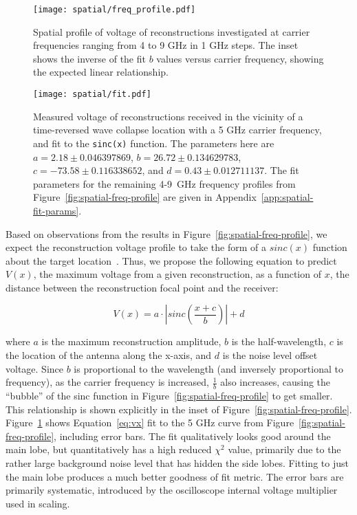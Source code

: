 \begin{figure}
\texttt{[image: spatial/freq\_profile.pdf]}
\caption[Spatial profile of reconstruction at various frequencies]{Spatial profile of \ptp{} voltage of reconstructions investigated at carrier frequencies ranging from 4 to 9 GHz in 1 GHz
steps.  The inset shows the inverse of the fit $b$ values versus carrier frequency, showing the expected linear relationship.}
\label{fig:spatial-freq-profile}

\vspace*{\floatsep}%

\texttt{[image: spatial/fit.pdf]}
\caption[Fit of spatial profile]{Measured \ptp{} voltage of reconstructions received in the
vicinity of a time-reversed wave collapse location with a 5 GHz carrier
frequency, and fit to the \texttt{sinc(x)} function. The parameters here are $a = 2.18 \pm 0.046397869$, $b = 26.72 \pm 0.134629783$, $c = -73.58 \pm 0.116338652$, and $d = 0.43 \pm 0.012711137$. The fit parameters for the remaining 4-9~GHz frequency profiles from Figure~\ref{fig:spatial-freq-profile} are given in Appendix~\ref{app:spatial-fit-params}.}
\label{fig:spatial-error-fit}
\end{figure}

Based on observations from the results in Figure~\ref{fig:spatial-freq-profile}, we expect the reconstruction \ptp{} voltage profile to take the form of a $sinc(x)$ function about the target location~\cite{lerosey-focusing}. Thus, we propose the following equation to predict $V(x)$, the maximum \ptp{} voltage from a given reconstruction, as a function of $x$, the distance between the reconstruction focal point and the receiver:

\begin{equation}
\label{eq:vx}
V(x) = a\cdot |sinc\left(\frac{x+c}{b}\right)| + d
\end{equation}

where $a$ is the maximum \ptp{} reconstruction amplitude, $b$ is the half-wavelength, $c$ is the location of the antenna along the x-axis, and $d$ is the noise level offset voltage. Since $b$ is proportional to the wavelength (and inversely proportional to frequency), as the carrier frequency is increased,  $\frac{1}{b}$ also increases, causing the ``bubble'' of the sinc function in Figure~\ref{fig:spatial-freq-profile} to get smaller. This relationship is shown explicitly in the inset of Figure~\ref{fig:spatial-freq-profile}. Figure~\ref{fig:spatial-error-fit} shows Equation~\ref{eq:vx} fit to the 5 GHz curve from Figure~\ref{fig:spatial-freq-profile}, including error bars. The fit qualitatively looks good around the main lobe, but quantitatively has a high reduced $\chi^2$ value, primarily due to the rather large background noise level that has hidden the side lobes. Fitting to just the main lobe produces a much better goodness of fit metric. The error bars are primarily systematic, introduced by the oscilloscope internal voltage multiplier used in scaling.

